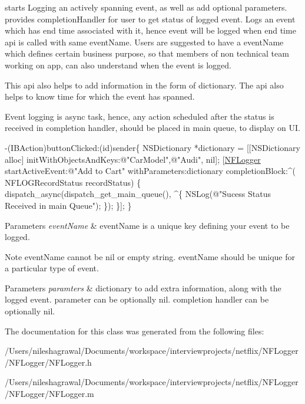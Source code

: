 starts Logging an actively spanning event, as well as add optional parameters. provides completion\+Handler for user to get status of logged event. Logs an event which has end time associated with it, hence event will be logged when end time api is called with same event\+Name. Users are suggested to have a event\+Name which defines certain business purpose, so that members of non technical team working on app, can also understand when the event is logged. 

This api also helps to add information in the form of dictionary. The api also helps to know time for which the event has spanned.

Event logging is async task, hence, any action scheduled after the status is received in completion handler, should be placed in main queue, to display on UI.


\begin{DoxyCode}
-(IBAction)buttonClicked:(\textcolor{keywordtype}{id})sender\{
 NSDictionary *dictionary = [[NSDictionary alloc] initWithObjectsAndKeys:\textcolor{stringliteral}{@"CarModel"},\textcolor{stringliteral}{@"Audi"}, nil];
 [\hyperlink{interface_n_f_logger}{NFLogger} startActiveEvent:\textcolor{stringliteral}{@"Add to Cart"} withParameters:dictionary completionBlock:^(
      NFLOGRecordStatus recordStatus) \{
      dispatch\_async(dispatch\_get\_main\_queue(), ^\{
          NSLog(\textcolor{stringliteral}{@"Sucess Status Received in main Queue"});
       \});
  \}];
\}
\end{DoxyCode}
 
\begin{DoxyParams}{Parameters}
{\em event\+Name} & event\+Name is a unique key defining your event to be logged. \\
\hline
\end{DoxyParams}
\begin{DoxyNote}{Note}
event\+Name cannot be nil or empty string. event\+Name should be unique for a particular type of event. 
\end{DoxyNote}

\begin{DoxyParams}{Parameters}
{\em paramters} & dictionary to add extra information, along with the logged event. parameter can be optionally nil. completion handler can be optionally nil. \\
\hline
\end{DoxyParams}


The documentation for this class was generated from the following files\+:\begin{DoxyCompactItemize}
\item 
/\+Users/nileshagrawal/\+Documents/workspace/interviewprojects/netflix/\+N\+F\+Logger/\+N\+F\+Logger/N\+F\+Logger.\+h\item 
/\+Users/nileshagrawal/\+Documents/workspace/interviewprojects/netflix/\+N\+F\+Logger/\+N\+F\+Logger/N\+F\+Logger.\+m\end{DoxyCompactItemize}
